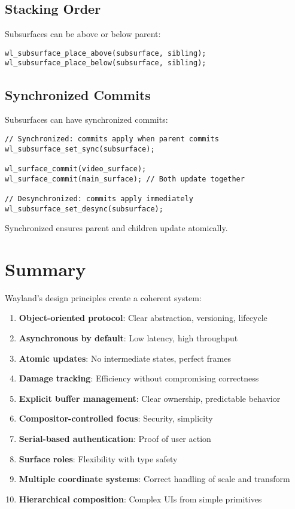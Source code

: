 \subsection{Stacking Order}

Subsurfaces can be above or below parent:

\begin{lstlisting}[style=cstyle, caption=Subsurface Stacking]
wl_subsurface_place_above(subsurface, sibling);
wl_subsurface_place_below(subsurface, sibling);
\end{lstlisting}

\subsection{Synchronized Commits}

Subsurfaces can have synchronized commits:

\begin{lstlisting}[style=cstyle, caption=Synchronization]
// Synchronized: commits apply when parent commits
wl_subsurface_set_sync(subsurface);

wl_surface_commit(video_surface);
wl_surface_commit(main_surface); // Both update together

// Desynchronized: commits apply immediately
wl_subsurface_set_desync(subsurface);
\end{lstlisting}

Synchronized ensures parent and children update atomically.

\section{Summary}

Wayland's design principles create a coherent system:

\begin{enumerate}
    \item \textbf{Object-oriented protocol}: Clear abstraction, versioning, lifecycle
    \item \textbf{Asynchronous by default}: Low latency, high throughput
    \item \textbf{Atomic updates}: No intermediate states, perfect frames
    \item \textbf{Damage tracking}: Efficiency without compromising correctness
    \item \textbf{Explicit buffer management}: Clear ownership, predictable behavior
    \item \textbf{Compositor-controlled focus}: Security, simplicity
    \item \textbf{Serial-based authentication}: Proof of user action
    \item \textbf{Surface roles}: Flexibility with type safety
    \item \textbf{Multiple coordinate systems}: Correct handling of scale and transform
    \item \textbf{Hierarchical composition}: Complex UIs from simple primitives
\end{enumerate}

